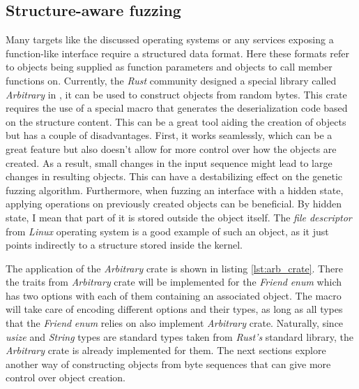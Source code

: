 %


\subsection{Structure-aware fuzzing}
Many targets like the discussed operating systems or any services exposing a function-like interface require a structured data format. Here these formats refer to objects being supplied as function parameters and objects to call member functions on. Currently, the \textit{Rust} community designed a special library called \textit{Arbitrary} in \cite{rustfuzzbook}, it can be used to construct objects from random bytes. This crate requires the use of a special macro that generates the deserialization code based on the structure content. This can be a great tool aiding the creation of objects but has a couple of disadvantages. First, it works seamlessly, which can be a great feature but also doesn't allow for more control over how the objects are created. As a result, small changes in the input sequence might lead to large changes in resulting objects. This can have a destabilizing effect on the genetic fuzzing algorithm. Furthermore, when fuzzing an interface with a hidden state, applying operations on previously created objects can be beneficial. By hidden state, I mean that part of it is stored outside the object itself. The \textit{file descriptor} from \textit{Linux} operating system is a good example of such an object, as it just points indirectly to a structure stored inside the kernel. 

The application of the \textit{Arbitrary} crate is shown in listing \ref{lst:arb_crate}. There the traits from \textit{Arbitrary} crate will be implemented for the \textit{Friend} \textit{enum} which has two options with each of them containing an associated object. The macro will take care of encoding different options and their types, as long as all types that the \textit{Friend} \textit{enum} relies on also implement \textit{Arbitrary} crate. Naturally, since \textit{usize} and \textit{String} types are standard types taken from \textit{Rust's} standard library, the \textit{Arbitrary} crate is already implemented for them. The next sections explore another way of constructing objects from byte sequences that can give more control over object creation.

